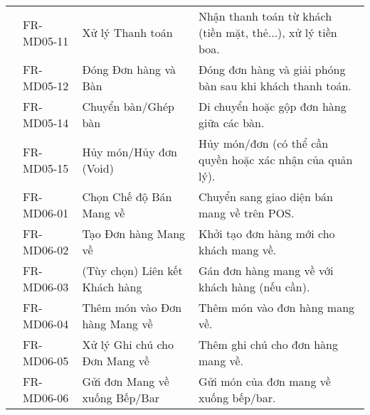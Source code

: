 \begin{longtable}{|m{2.5cm}|m{2.5cm}|m{5cm}|m{5cm}|}
	                                                        & FR-MD05-11            & Xử lý Thanh toán                                       & Nhận thanh toán từ khách (tiền mặt, thẻ...), xử lý tiền boa.                                \\
	                                                        & FR-MD05-12            & Đóng Đơn hàng và Bàn                                   & Đóng đơn hàng và giải phóng bàn sau khi khách thanh toán.                                   \\
	                                                        & FR-MD05-14            & Chuyển bàn/Ghép bàn                                    & Di chuyển hoặc gộp đơn hàng giữa các bàn.                                                   \\
	                                                        & FR-MD05-15            & Hủy món/Hủy đơn (Void)                                 & Hủy món/đơn (có thể cần quyền hoặc xác nhận của quản lý).                                   \\ \cline{2-4}
	                                                        & FR-MD06-01            & Chọn Chế độ Bán Mang về                                & Chuyển sang giao diện bán mang về trên POS.                                                 \\
	                                                        & FR-MD06-02            & Tạo Đơn hàng Mang về                                   & Khởi tạo đơn hàng mới cho khách mang về.                                                    \\
	                                                        & FR-MD06-03            & (Tùy chọn) Liên kết Khách hàng                         & Gán đơn hàng mang về với khách hàng (nếu cần).                                              \\
	                                                        & FR-MD06-04            & Thêm món vào Đơn hàng Mang về                          & Thêm món vào đơn hàng mang về.                                                              \\
	                                                        & FR-MD06-05            & Xử lý Ghi chú cho Đơn Mang về                          & Thêm ghi chú cho đơn hàng mang về.                                                          \\
	                                                        & FR-MD06-06            & Gửi đơn Mang về xuống Bếp/Bar                          & Gửi món của đơn mang về xuống bếp/bar.                                                      \\

\end{longtable}
